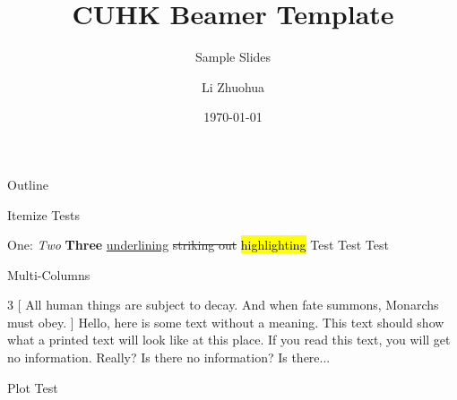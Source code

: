 

\title[Sample]{CUHK Beamer Template}
\subtitle{Sample Slides}
\author[Li Zhuohua]{Li Zhuohua}
\date{\today}



\frame[plain]{\maketitle}

\begin{frame}{Outline}
  \tableofcontents{}
\end{frame}

\begin{frame}{Itemize Tests}
	\renewcommand{\outlineii}{enumerate}
	\begin{outline}
		\1 One: \textit{Two} \textbf{Three}
			\2 
			\2 \ul{underlining}
			\2 \st{striking out}
			\2 \hl{highlighting}
			\2 
		\1 Test Test Test
	\end{outline}
\end{frame}

\begin{frame}{Multi-Columns}
	\begin{multicols}{3}
    [
    All human things are subject to decay. And when fate summons, Monarchs must obey.
    ]
    Hello, here is some text without a meaning.  This text should show what 
    a printed text will look like at this place.
    If you read this text, you will get no information.  Really?  Is there 
    no information?  Is there...
    \end{multicols}
\end{frame}

\begin{frame}{Plot Test}
    \pgfplotsset{width=5.5cm,compat=1.9}
    \hskip 5pt
\end{frame}

